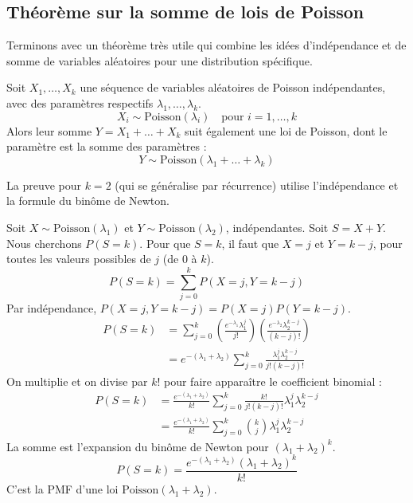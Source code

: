 \subsection{Théorème sur la somme de lois de Poisson}

Terminons avec un théorème très utile qui combine les idées d'indépendance et de somme de variables aléatoires pour une distribution spécifique.

\begin{theorembox}
Soit $X_1, \dots, X_k$ une séquence de variables aléatoires de Poisson indépendantes, avec des paramètres respectifs $\lambda_1, \dots, \lambda_k$.
$$X_i \sim \text{Poisson}(\lambda_i) \quad \text{pour } i=1, \dots, k$$
Alors leur somme $Y = X_1 + \dots + X_k$ suit également une loi de Poisson, dont le paramètre est la somme des paramètres :
$$Y \sim \text{Poisson}(\lambda_1 + \dots + \lambda_k)$$
\end{theorembox}

La preuve pour $k=2$ (qui se généralise par récurrence) utilise l'indépendance et la formule du binôme de Newton.

\begin{proofbox}
Soit $X \sim \text{Poisson}(\lambda_1)$ et $Y \sim \text{Poisson}(\lambda_2)$, indépendantes.
Soit $S = X+Y$. Nous cherchons $P(S=k)$.
Pour que $S=k$, il faut que $X=j$ et $Y=k-j$, pour toutes les valeurs possibles de $j$ (de $0$ à $k$).
$$ P(S=k) = \sum_{j=0}^k P(X=j, Y=k-j) $$
Par indépendance, $P(X=j, Y=k-j) = P(X=j)P(Y=k-j)$.
\begin{align*}
P(S=k) &= \sum_{j=0}^k \left( \frac{e^{-\lambda_1}\lambda_1^j}{j!} \right) \left( \frac{e^{-\lambda_2}\lambda_2^{k-j}}{(k-j)!} \right) \\
&= e^{-(\lambda_1 + \lambda_2)} \sum_{j=0}^k \frac{\lambda_1^j \lambda_2^{k-j}}{j!(k-j)!}
\end{align*}
On multiplie et on divise par $k!$ pour faire apparaître le coefficient binomial :
\begin{align*}
P(S=k) &= \frac{e^{-(\lambda_1 + \lambda_2)}}{k!} \sum_{j=0}^k \frac{k!}{j!(k-j)!} \lambda_1^j \lambda_2^{k-j} \\
&= \frac{e^{-(\lambda_1 + \lambda_2)}}{k!} \sum_{j=0}^k \binom{k}{j} \lambda_1^j \lambda_2^{k-j}
\end{align*}
La somme est l'expansion du binôme de Newton pour $(\lambda_1 + \lambda_2)^k$.
$$ P(S=k) = \frac{e^{-(\lambda_1 + \lambda_2)} (\lambda_1 + \lambda_2)^k}{k!} $$
C'est la PMF d'une loi $\text{Poisson}(\lambda_1 + \lambda_2)$.
\end{proofbox}

